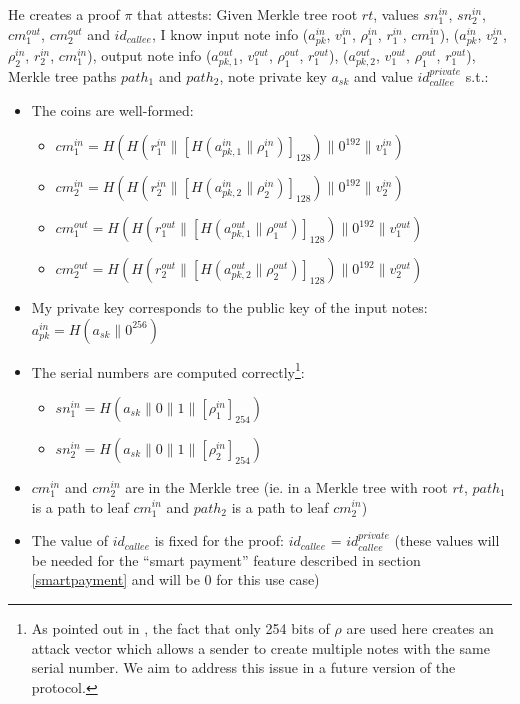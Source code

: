 \documentclass{article}
\newcommand{\conc}{\mathbin{\|}}
\begin{document}
He creates a proof $\pi$ that attests:
Given Merkle tree root $rt$, values $sn_1^{in}$, $sn_2^{in}$, $cm_1^{out}$, $cm_2^{out}$ and $id_{callee}$, I know input note info
($a_{pk}^{in}$, $v_1^{in}$, $\rho_1^{in}$, $r_1^{in}$, $cm_1^{in}$),
($a_{pk}^{in}$, $v_2^{in}$, $\rho_2^{in}$, $r_2^{in}$, $cm_1^{in}$),
output note info 
($a_{pk,1}^{out}$, $v_1^{out}$, $\rho_1^{out}$, $r_1^{out}$),
($a_{pk,2}^{out}$, $v_1^{out}$, $\rho_1^{out}$, $r_1^{out}$),
Merkle tree paths $path_1$ and $path_2$, note private key $a_{sk}$ and value $id_{callee}^{private}$ s.t.:
\begin{itemize}
    \item The coins are well-formed:
    \begin{itemize}
        \item $cm_1^{in} = H(H(r_1^{in} \conc [H(a_{pk,1}^{in} \conc \rho_1^{in})]_{128}) \conc 0^{192} \conc v_1^{in})$
        \item $cm_2^{in} = H(H(r_2^{in} \conc [H(a_{pk,2}^{in} \conc \rho_2^{in})]_{128}) \conc 0^{192} \conc v_2^{in})$
        \item $cm_1^{out} = H(H(r_1^{out} \conc [H(a_{pk,1}^{out} \conc \rho_1^{out})]_{128}) \conc 0^{192} \conc v_1^{out})$
        \item $cm_2^{out} = H(H(r_2^{out} \conc [H(a_{pk,2}^{out} \conc \rho_2^{out})]_{128}) \conc 0^{192} \conc v_2^{out})$
    \end{itemize}
    \item My private key corresponds to the public key of the input notes: $a_{pk}^{in} = H(a_{sk} \conc 0^{256})$
    \item{The serial numbers are computed correctly\footnote{As pointed out in \cite{zeth}, the fact that only 254 bits of $\rho$ are used here creates an attack vector which allows a sender to create multiple notes with the same serial number. We aim to address this issue in a future version of the protocol.}:
    \begin{itemize}
        \item $sn_1^{in} = H(a_{sk} \conc 0 \conc 1 \conc [\rho_1^{in}]_{254})$
        \item $sn_2^{in} = H(a_{sk} \conc 0 \conc 1 \conc [\rho_2^{in}]_{254})$
    \end{itemize}}
    \item $cm_1^{in}$ and $cm_2^{in}$ are in the Merkle tree (ie. in a Merkle tree with root $rt$, $path_1$ is a path to leaf $cm_1^{in}$ and $path_2$ is a path to leaf $cm_2^{in}$)
    \item The value of $id_{callee}$ is fixed for the proof: $id_{callee}$ = $id_{callee}^{private}$ (these values will be needed for the ``smart payment'' feature described in section \ref{smartpayment} and will be 0 for this use case)
\end{itemize}
\end{document}
